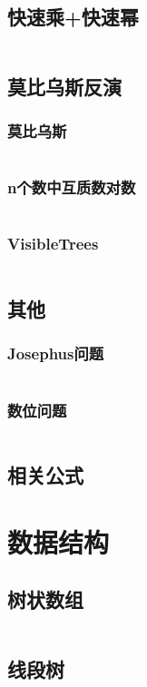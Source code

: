   \subsection{快速乘+快速幂}
    \inputminted{cpp}{src/3_数学/6_快速乘+快速幂.cpp}
  \subsection{莫比乌斯反演}
    \subsubsection{莫比乌斯}
      \inputminted{cpp}{src/3_数学/7_莫比乌斯反演/1_莫比乌斯.cpp}
    \subsubsection{n个数中互质数对数}
      \inputminted{cpp}{src/3_数学/7_莫比乌斯反演/2_n个数中互质数对数.cpp}
    \subsubsection{VisibleTrees}
      \inputminted{cpp}{src/3_数学/7_莫比乌斯反演/3_VisibleTrees.cpp}
  \subsection{其他}
    \subsubsection{Josephus问题}
      \inputminted{cpp}{src/3_数学/8_其他/1_Josephus问题.cpp}
    \subsubsection{数位问题}
      \inputminted{cpp}{src/3_数学/8_其他/2_数位问题.cpp}
  \subsection{相关公式}
    
\section{数据结构}
  \subsection{树状数组}
    \inputminted{cpp}{src/4_数据结构/1_树状数组.cpp}
  \subsection{线段树}

